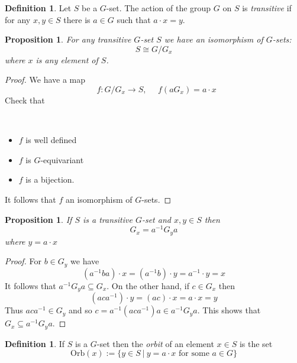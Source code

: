 \documentclass[12pt, letterpaper, oneside]{article}
\theoremstyle{plain}
\newtheorem{proposition}[theorem]{Proposition}
\theoremstyle{definition}
\newtheorem{definition}[theorem]{Definition}
\newcommand{\Orb}{\mathrm{Orb}}
\newcommand{\bit}{\begin{itemize}}
\newcommand{\eit}{\end{itemize}}
\newcommand{\vs}{\vskip 5mm}
\newcommand{\isep}[1][0]{\setlength{\itemsep}{#1 mm}}
\begin{document}
\vs\vs

\begin{definition}
Let $S$ be a $G$-set. The action of the group $G$ on $S$ is \emph{transitive} 
if for any $x, y\in S$ there is $a\in G$ such that $a\cdot x = y$.
\end{definition}

\vs\vs



\begin{proposition}
\label{PROP_TRANSGSET}
For any transitive $G$-set $S$ we have an isomorphism of $G$-sets:
$$S \cong G/G_{x}$$
where $x$ is any element of $S$. 
\end{proposition}

\begin{proof}
We have a map 
$$\ \ \ f\colon G/G_{x} \to S, \ \ \ \ \ \  f(aG_{x}) = a\cdot x$$
Check that 

\vskip -13mm

\ 
\bit
\isep
\item $f$ is well defined
\item $f$ is  $G$-equivariant
\item $f$ is a bijection.
\eit
It follows that $f$ an isomorphism of $G$-sets. 
\end{proof}


\vs\vs

\begin{proposition}
If $S$ is a transitive $G$-set and $x, y\in S$ then 
$$G_{x} = a^{-1}G_{y}a$$
where $y = a\cdot x$
\end{proposition}

\begin{proof}
For  $b\in G_{y}$ we have
$$(a^{-1}ba)\cdot x = (a^{-1}b) \cdot y = a^{-1}\cdot y = x $$ 
It follows that $a^{-1}G_{y}a \subseteq G_{x}$. On the other hand, if $c\in G_{x}$
then 
$$(aca^{-1})\cdot y = (ac) \cdot x = a\cdot x = y$$
Thus $aca^{-1}\in G_{y}$ and so $c = a^{-1}(aca^{-1})a \in a^{-1}G_{y}a$. This shows that 
$G_{x}\subseteq a^{-1}G_{y}a$.
\end{proof}


\vs\vs

\begin{definition}
If $S$ is a $G$-set then the \emph{orbit}  of an element $x\in S$ is the set 
$$\Orb(x) := \{y \in S \ | \  y = a\cdot x \text{ for some } a\in G \}$$  
\end{definition}


\vs\vs
\end{document}

